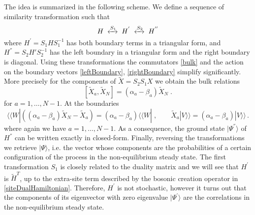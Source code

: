 \documentclass[10pt]{article}
\numberwithin{equation}{section}
\numberwithin{equation}{subsection}
\newcommand{\Xt}{\widetilde{X}}
\newcommand{\co}{\;,}
\newcommand{\dt}{\;.}
\begin{document}
 The idea is summarized in the following scheme. 
 We define a sequence of similarity transformation such that 
 \begin{equation}
 	H\;\xleftrightarrow{S_{1}}\;H^{'}\;\xleftrightarrow{S_{2}}\;H^{''}
 \end{equation} 
 where $H^{'}= S_{1} H S_{1}^{-1} $ has both boundary terms in a triangular form, and $H^{''} = S_{2}H' S_{2}^{-1}$ has the left boundary in a triangular form and the right boundary is diagonal. Using these transformations the commutators \eqref{bulk} and the action on the boundary vectors \eqref{leftBoundary}, \eqref{rightBoundary} simplify significantly. More precisely for the components of $\tilde X=S_2S_1 X$ we obtain the bulk relations
\begin{equation}\label{commutationsBula2}
	\left[\Xt_{a},\Xt_{N}\right]=(\alpha_{a}-\beta_{a})\Xt_{N}\dt %
\end{equation}
for $a=1,\ldots,N-1$. 
At the boundaries 
\begin{equation}\label{commLEFT2}
	 \langle \langle W|  \left((\alpha_{a}-\beta_{a})\Xt_{N}-\Xt_{a}\right)=(\alpha_{a}-\beta_{a}) \langle \langle W|  %
	\co \qquad 
	\Xt_{a}  |V\rangle\rangle = (\alpha_{a}-\beta_{a}) |V\rangle\rangle %
	\,.
\end{equation} 
where again we have  $a=1,\ldots,N-1$.   As a consequence, the ground state $|\Psi^{''}\rangle$ of $H^{''}$ can be written exactly in closed-form. Finally, reversing the transformations we retrieve $|\Psi\rangle$, i.e. the vector whose components are the probabilities of a certain configuration of the process in the non-equilibrium steady state.
 The first transformation $S_{1}$ is closely related to the duality matrix and we will see that $H^{'}$ is $\widetilde{H}^{T}$, up to the extra-site term described by the bosonic creation operator in \eqref{siteDualHamiltonian}. Therefore, $H^{'}$ is not stochastic, however it turns out that the components of its eigenvector with zero eigenvalue $|\Psi^{'}\rangle$ are the correlations in the non-equilibrium steady state. 
\end{document}

